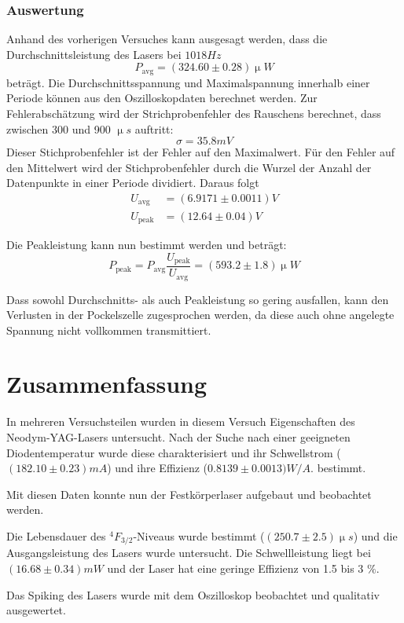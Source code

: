 \documentclass{../Misc/MontavonLaTeX/Montavon}
\begin{document}
\subsubsection{Auswertung}
Anhand des vorherigen Versuches kann ausgesagt werden, dass die Durchschnittsleistung des Lasers bei $1018 \unit{Hz}$ 
\[
	P_\textrm{avg} = (324.60 \pm 0.28) \unit{\upmu W}
\]
beträgt. 
Die Durchschnittsspannung und Maximalspannung innerhalb einer Periode können aus den Oszilloskopdaten berechnet werden. Zur Fehlerabschätzung wird der Strichprobenfehler des Rauschens berechnet, dass zwischen 300 und 900 $\unit{\upmu s}$ auftritt:
\[
	\sigma = 35.8 \unit{mV}
\]
Dieser Stichprobenfehler ist der Fehler auf den Maximalwert. Für den Fehler auf den Mittelwert wird der Stichprobenfehler durch die Wurzel der Anzahl der Datenpunkte in einer Periode dividiert. Daraus folgt
\begin{align*}
	U_\textrm{avg} &= (6.9171 \pm 0.0011) V \\
	U_\textrm{peak} &= (12.64 \pm 0.04) V
\end{align*}

Die Peakleistung kann nun bestimmt werden und beträgt:
\[
P_\textrm{peak} = P_\textrm{avg} \frac{U_\textrm{peak}}{U_\textrm{avg}} = (593.2 \pm 1.8) \unit{\upmu W}
\]

Dass sowohl Durchschnitts- als auch Peakleistung so gering ausfallen, kann den Verlusten in der Pockelszelle zugesprochen werden, da diese auch ohne angelegte Spannung nicht vollkommen transmittiert.

\section{Zusammenfassung}
In mehreren Versuchsteilen wurden in diesem Versuch Eigenschaften des Neodym-YAG-Lasers untersucht. 
Nach der Suche nach einer geeigneten Diodentemperatur wurde diese charakterisiert und ihr Schwellstrom ($(182.10 \pm 0.23) \unit{mA}$) und ihre Effizienz ($0.8139 \pm 0.0013) \unit{W/A}$. bestimmt. 

Mit diesen Daten konnte nun der Festkörperlaser aufgebaut und beobachtet werden. 

Die Lebensdauer des $^4 F_{3/2}$-Niveaus wurde bestimmt ($(250.7 \pm 2.5) \unit{\upmu s}$) und die Ausgangsleistung des Lasers wurde untersucht. Die Schwellleistung liegt bei $(16.68 \pm 0.34) \unit{mW}$ und der Laser hat eine geringe Effizienz von 1.5 bis 3 $\unit{\%}$.

Das Spiking des Lasers wurde mit dem Oszilloskop beobachtet und qualitativ ausgewertet. 
\end{document}
